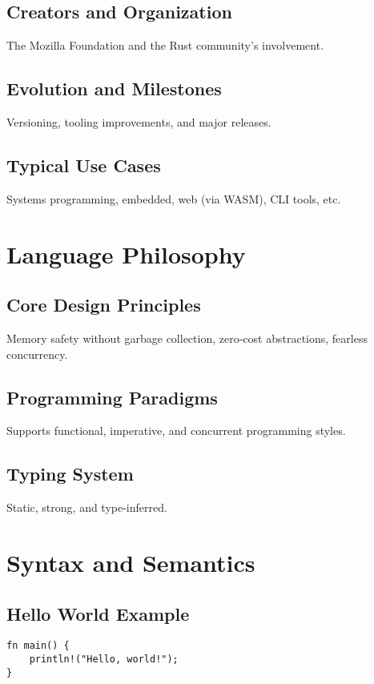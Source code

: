 \documentclass[a4paper,12pt]{article}
\begin{document}
\subsection{Creators and Organization}
The Mozilla Foundation and the Rust community’s involvement.

\subsection{Evolution and Milestones}
Versioning, tooling improvements, and major releases.

\subsection{Typical Use Cases}
Systems programming, embedded, web (via WASM), CLI tools, etc.

\section{Language Philosophy}

\subsection{Core Design Principles}
Memory safety without garbage collection, zero-cost abstractions, fearless concurrency.

\subsection{Programming Paradigms}
Supports functional, imperative, and concurrent programming styles.

\subsection{Typing System}
Static, strong, and type-inferred.

\section{Syntax and Semantics}

\subsection{Hello World Example}
\begin{verbatim}
fn main() {
    println!("Hello, world!");
}
\end{verbatim}
\end{document}
